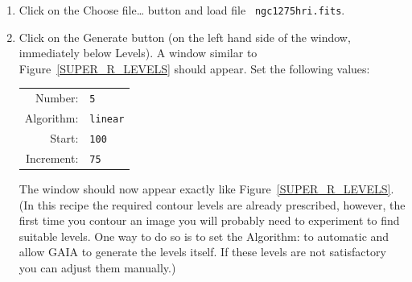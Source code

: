 \documentclass[twoside,11pt]{article}
\renewcommand{\_}{\texttt{\symbol{95}}}
\begin{document}
\begin{enumerate}
  \item Click on the {\sf Choose file\ldots} button and load file {\tt
   ngc1275hri.fits}.

  \item Click on the {\sf Generate} button (on the left hand side of the
   window, immediately below {\sf Levels}).  A window similar to
   Figure~\ref{SUPER_R_LEVELS} should appear.  Set the following values:

  \begin{center}
  \begin{tabular}{rl}
   {\sf Number:}    & {\tt 5} \\
   {\sf Algorithm:} & {\tt linear} \\
   {\sf Start:}     & {\tt 100} \\
   {\sf Increment:} & {\tt 75} \\
  \end{tabular}
  \end{center}

   The window should now appear exactly like Figure~\ref{SUPER_R_LEVELS}.
   (In this recipe the required contour levels are already prescribed,
   however, the first time you contour an image you will probably need
   to experiment to find suitable levels.  One way to do so is to set the
   {\sf Algorithm:} to {\sf automatic} and allow GAIA to generate the
   levels itself.  If these levels are not satisfactory you can adjust
   them manually.)


\end{enumerate}
\end{document}
